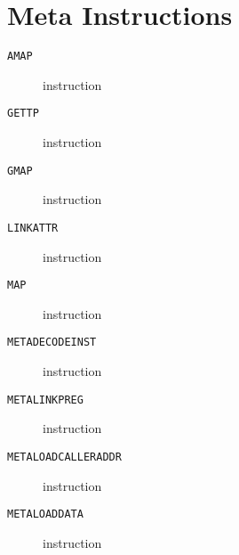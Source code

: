 \section{Meta Instructions}
\begin{description}
\item[\texttt{AMAP}] instruction\\

\end{description}
\clearpage
\begin{description}
\item[\texttt{GETTP}] instruction\\

\end{description}
\clearpage
\begin{description}
\item[\texttt{GMAP}] instruction\\

\end{description}
\clearpage
\begin{description}
\item[\texttt{LINKATTR}] instruction\\

\end{description}
\clearpage
\begin{description}
\item[\texttt{MAP}] instruction\\

\end{description}
\clearpage
\begin{description}
\item[\texttt{METADECODEINST}] instruction\\

\end{description}
\clearpage
\begin{description}
\item[\texttt{METALINKPREG}] instruction\\

\end{description}
\clearpage
\begin{description}
\item[\texttt{METALOADCALLERADDR}] instruction\\

\end{description}
\clearpage
\begin{description}
\item[\texttt{METALOADDATA}] instruction\\

\end{description}
